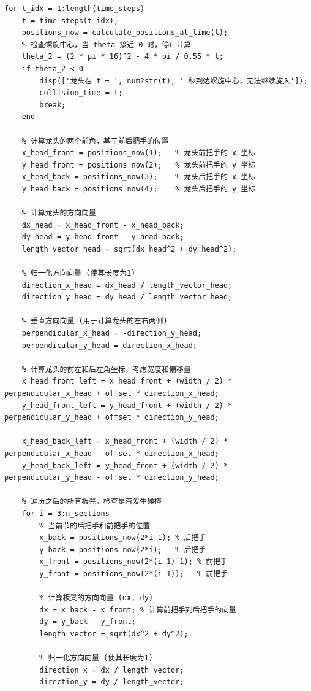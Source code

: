 \documentclass{cumcmthesis1}
\begin{document}
\begin{lstlisting}[caption={求解问题2的代码，将碰撞时间打印到控制台，并将位置，速度等信息写入到result2.xlsx中}, label={lst:second_code}]
% 主循环，只检测龙头的碰撞
for t_idx = 1:length(time_steps)
    t = time_steps(t_idx);
    positions_now = calculate_positions_at_time(t);
    % 检查螺旋中心，当 theta 接近 0 时，停止计算
    theta_2 = (2 * pi * 16)^2 - 4 * pi / 0.55 * t;
    if theta_2 < 0
        disp(['龙头在 t = ', num2str(t), ' 秒到达螺旋中心，无法继续旋入']);
        collision_time = t;
        break;
    end
    
    % 计算龙头的两个前角，基于前后把手的位置
    x_head_front = positions_now(1);   % 龙头前把手的 x 坐标
    y_head_front = positions_now(2);   % 龙头前把手的 y 坐标
    x_head_back = positions_now(3);    % 龙头后把手的 x 坐标
    y_head_back = positions_now(4);    % 龙头后把手的 y 坐标
    
    % 计算龙头的方向向量
    dx_head = x_head_front - x_head_back;
    dy_head = y_head_front - y_head_back;
    length_vector_head = sqrt(dx_head^2 + dy_head^2);
    
    % 归一化方向向量 (使其长度为1)
    direction_x_head = dx_head / length_vector_head;
    direction_y_head = dy_head / length_vector_head;
    
    % 垂直方向向量 (用于计算龙头的左右两侧)
    perpendicular_x_head = -direction_y_head;
    perpendicular_y_head = direction_x_head;
    
    % 计算龙头的前左和后左角坐标，考虑宽度和偏移量
    x_head_front_left = x_head_front + (width / 2) * perpendicular_x_head + offset * direction_x_head;
    y_head_front_left = y_head_front + (width / 2) * perpendicular_y_head + offset * direction_y_head;
    
    x_head_back_left = x_head_front + (width / 2) * perpendicular_x_head - offset * direction_x_head;
    y_head_back_left = y_head_front + (width / 2) * perpendicular_y_head - offset * direction_y_head;
    
    % 遍历之后的所有板凳，检查是否发生碰撞
    for i = 3:n_sections
        % 当前节的后把手和前把手的位置
        x_back = positions_now(2*i-1); % 后把手
        y_back = positions_now(2*i);   % 后把手
        x_front = positions_now(2*(i-1)-1); % 前把手
        y_front = positions_now(2*(i-1));   % 前把手
        
        % 计算板凳的方向向量 (dx, dy)
        dx = x_back - x_front; % 计算前把手到后把手的向量
        dy = y_back - y_front;
        length_vector = sqrt(dx^2 + dy^2);
        
        % 归一化方向向量 (使其长度为1)
        direction_x = dx / length_vector;
        direction_y = dy / length_vector;
        

\end{lstlisting}
\end{document}
